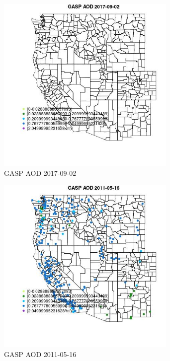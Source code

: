 \begin{figure} 
\centering  
\includegraphics[width=0.77\textwidth]{Code_Outputs/Report_ML_input_PM25_Step4_part_e_de_duplicated_aves_compiled_2019-05-20wNAs_MapObsGASP_AOD2017-09-02.jpg} 
\caption{\label{fig:Report_ML_input_PM25_Step4_part_e_de_duplicated_aves_compiled_2019-05-20wNAsMapObsGASP_AOD2017-09-02}GASP AOD 2017-09-02} 
\end{figure} 
 

\begin{figure} 
\centering  
\includegraphics[width=0.77\textwidth]{Code_Outputs/Report_ML_input_PM25_Step4_part_e_de_duplicated_aves_compiled_2019-05-20wNAs_MapObsGASP_AOD2011-05-16.jpg} 
\caption{\label{fig:Report_ML_input_PM25_Step4_part_e_de_duplicated_aves_compiled_2019-05-20wNAsMapObsGASP_AOD2011-05-16}GASP AOD 2011-05-16} 
\end{figure} 
 

